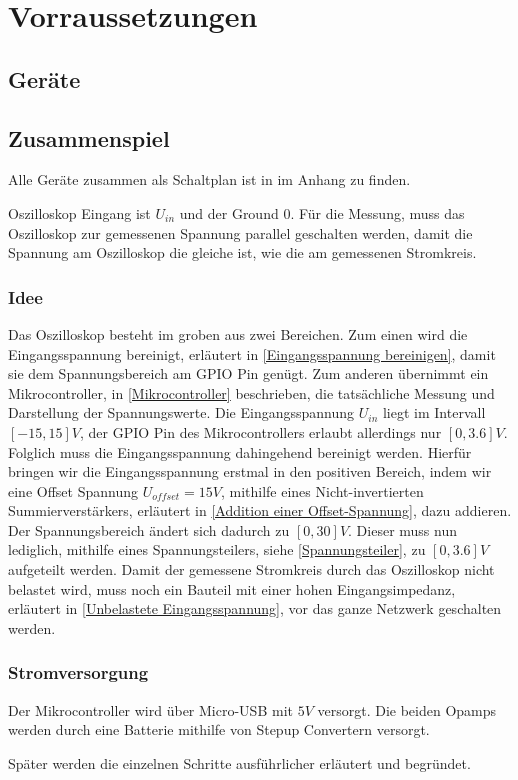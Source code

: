 \section{Vorraussetzungen}
\label{Vorraussetzungen}


\subsection{Geräte}




\subsection{Zusammenspiel}

Alle Geräte zusammen als Schaltplan ist in  im Anhang zu finden.


Oszilloskop Eingang ist $U_{in}$ und der Ground $0$. \newline
Für die Messung, muss das Oszilloskop zur gemessenen Spannung parallel geschalten werden,
damit die Spannung am Oszilloskop die gleiche ist, wie die am gemessenen Stromkreis.

\subsubsection{Idee}
Das Oszilloskop besteht im groben aus zwei Bereichen.
Zum einen wird die Eingangsspannung bereinigt, erläutert in \ref{Eingangsspannung bereinigen},
damit sie dem Spannungsbereich am GPIO Pin genügt.
Zum anderen übernimmt ein Mikrocontroller, in \ref{Mikrocontroller} beschrieben,
die tatsächliche Messung und Darstellung der Spannungswerte. \newline
Die Eingangsspannung $U_{in}$ liegt im Intervall $[-15, 15] V$,
der GPIO Pin des Mikrocontrollers erlaubt allerdings nur $[0, 3.6] V$. \newline
Folglich muss die Eingangsspannung dahingehend bereinigt werden.
\newline \newline
Hierfür bringen wir die Eingangsspannung erstmal in den positiven Bereich, indem wir
eine Offset Spannung $U_{offset} = 15V$, mithilfe eines Nicht-invertierten Summierverstärkers,
erläutert in \ref{Addition einer Offset-Spannung}, dazu addieren. \newline
Der Spannungsbereich ändert sich dadurch zu $[0, 30] V$.
Dieser muss nun lediglich, mithilfe eines Spannungsteilers, siehe \ref{Spannungsteiler},
zu $[0, 3.6] V$ aufgeteilt werden.
Damit der gemessene Stromkreis durch das Oszilloskop nicht belastet wird,
muss noch ein Bauteil mit einer hohen Eingangsimpedanz, erläutert in \ref{Unbelastete Eingangsspannung},
vor das ganze Netzwerk geschalten werden.


\subsubsection{Stromversorgung}
Der Mikrocontroller wird über Micro-USB mit $5V$ versorgt.
Die beiden Opamps werden durch eine Batterie mithilfe von Stepup Convertern versorgt.

Später werden die einzelnen Schritte ausführlicher erläutert und begründet.



